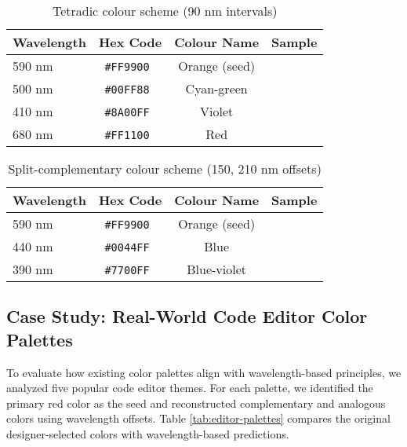 \documentclass[12pt,a4paper]{article}
\newcommand{\hexcolour}[1]{%
  \definecolor{tempcolour}{HTML}{#1}%
  \texttt{\##1}~\raisebox{0.2ex}{\fboxsep=0pt\fbox{\colorbox{tempcolour}{\phantom{XX}}}}%
}
\begin{document}
\begin{table}[ht]
\centering
\caption{Tetradic colour scheme (90 nm intervals)}
\label{tab:results-tetradic}
\begin{tabular}{lccc}
\toprule
\textbf{Wavelength} & \textbf{Hex Code} & \textbf{Colour Name} & \textbf{Sample} \\
\midrule
590 nm & \hexcolour{FF9900} & Orange (seed) & \cellcolor{orange590}\phantom{XX} \\
500 nm & \hexcolour{00FF88} & Cyan-green & \cellcolor{green530!50!cyan}\phantom{XX} \\
410 nm & \hexcolour{8A00FF} & Violet & \cellcolor{violet410}\phantom{XX} \\
680 nm & \hexcolour{FF1100} & Red & \cellcolor{red}\phantom{XX} \\
\bottomrule
\end{tabular}
\end{table}

\begin{table}[ht]
\centering
\caption{Split-complementary colour scheme (150, 210 nm offsets)}
\label{tab:results-split}
\begin{tabular}{lccc}
\toprule
\textbf{Wavelength} & \textbf{Hex Code} & \textbf{Colour Name} & \textbf{Sample} \\
\midrule
590 nm & \hexcolour{FF9900} & Orange (seed) & \cellcolor{orange590}\phantom{XX} \\
440 nm & \hexcolour{0044FF} & Blue & \cellcolor{blue}\phantom{XX} \\
390 nm & \hexcolour{7700FF} & Blue-violet & \cellcolor{violet410!80!blue}\phantom{XX} \\
\bottomrule
\end{tabular}
\end{table}

\subsection{Case Study: Real-World Code Editor Color Palettes}

To evaluate how existing color palettes align with wavelength-based principles, we analyzed five popular code editor themes. For each palette, we identified the primary red color as the seed and reconstructed complementary and analogous colors using wavelength offsets. Table \ref{tab:editor-palettes} compares the original designer-selected colors with wavelength-based predictions.
\end{document}
